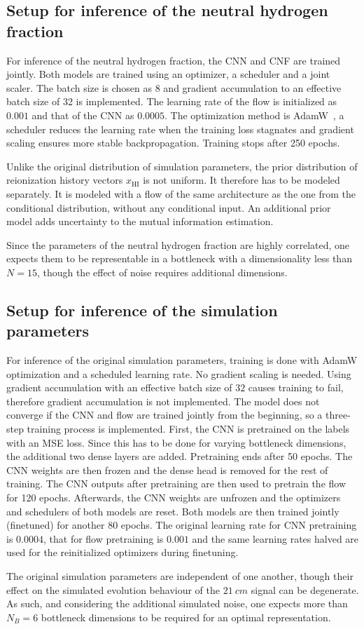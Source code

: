 \subsection{Setup for inference of the neutral hydrogen fraction}
For inference of the neutral hydrogen fraction, the CNN and CNF are trained jointly. Both models are trained using an optimizer, a scheduler and a joint scaler. The batch size is chosen as 8 and gradient accumulation to an effective batch size of 32 is implemented. The learning rate of the flow is initialized as $0.001$ and that of the CNN as $0.0005$. The optimization method is AdamW~\cite{AdamW}, a scheduler reduces the learning rate when the training loss stagnates and gradient scaling ensures more stable backpropagation. Training stops after 250 epochs.

Unlike the original distribution of simulation parameters, the prior distribution of reionization history vectors $x_\text{HI}$ is not uniform. It therefore has to be modeled separately. It is modeled with a flow of the same architecture as the one from the conditional distribution, without any conditional input. An additional prior model adds uncertainty to the mutual information estimation.

Since the parameters of the neutral hydrogen fraction are highly correlated, one expects them to be representable in a bottleneck with a dimensionality less than $N=15$, though the effect of noise requires additional dimensions.

\subsection{Setup for inference of the simulation parameters}
For inference of the original simulation parameters, training is done with AdamW optimization and a scheduled learning rate. No gradient scaling is needed. Using gradient accumulation with an effective batch size of $32$ causes training to fail, therefore gradient accumulation is not implemented. The model does not converge if the CNN and flow are trained jointly from the beginning, so a three-step training process is implemented. First, the CNN is pretrained on the labels with an MSE loss. Since this has to be done for varying bottleneck dimensions, the additional two dense layers are added. Pretraining ends after 50 epochs. The CNN weights are then frozen and the dense head is removed for the rest of training. The CNN outputs after pretraining are then used to pretrain the flow for 120 epochs. Afterwards, the CNN weights are unfrozen and the optimizers and schedulers of both models are reset. Both models are then trained jointly (finetuned) for another 80 epochs. The original learning rate for CNN pretraining is $0.0004$, that for flow pretraining is $0.001$ and the same learning rates halved are used for the reinitialized optimizers during finetuning.

The original simulation parameters are independent of one another, though their effect on the simulated evolution behaviour of the $21~\si{cm}$ signal can be degenerate. As such, and considering the additional simulated noise, one expects more than $N_B=6$ bottleneck dimensions to be required for an optimal representation.